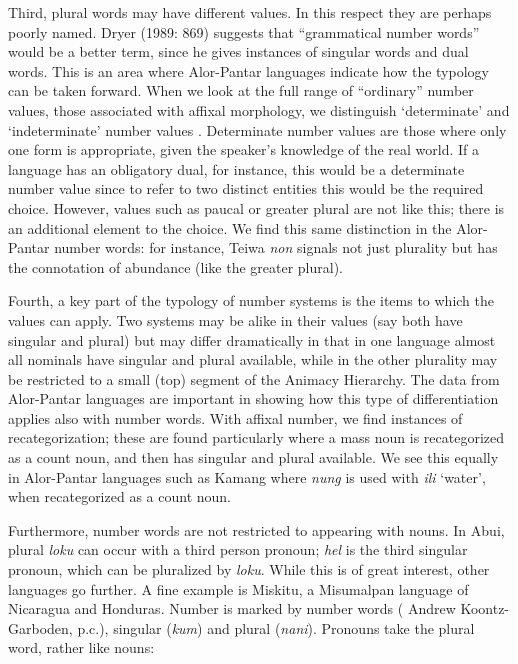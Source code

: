  Third, plural words may have different values. In this respect they are perhaps poorly named. Dryer (1989: 869) suggests that ``grammatical number words'' would be a better term, since he gives instances of singular words and dual words. This is an area where Alor-Pantar languages indicate how the typology can be taken forward. When we look at the full range of ``ordinary'' number values, those associated with affixal morphology, we distinguish `determinate' and `indeterminate' number values \citep[39-41]{Corbett2000}. Determinate number values are those where only one form is appropriate, given the speaker's knowledge of the real world. If a language has an obligatory dual, for instance, this would be a determinate number value since to refer to two distinct entities this would be the required choice. However, values such as paucal or greater plural are not like this; there is an additional element to the choice. We find this same distinction in the Alor-Pantar number words: for instance, Teiwa \textit{non
}signals not just plurality but has the connotation of abundance (like the greater plural).

 Fourth, a key part of the typology of number systems is the items to which the values can apply. Two systems may be alike in their values (say both have singular and plural) but may differ dramatically in that in one language almost all nominals have singular and plural available, while in the other plurality may be restricted to a small (top) segment of the Animacy Hierarchy. The data from Alor-Pantar languages are important in showing how this type of differentiation applies also with number words. With affixal number, we find instances of recategorization; these are found particularly where a mass noun is recategorized as a count noun, and then has singular and plural available. We see this equally in Alor-Pantar languages such as Kamang where \textit{nung} is used with \textit{ili} `water', when recategorized as a count noun.

 Furthermore, number words are not restricted to appearing with nouns. In Abui, plural \textit{loku} can occur with a third person pronoun; \textit{hel} is the third singular pronoun, which can be pluralized by \textit{loku}. While this is of great interest, other languages go further. A fine example is Miskitu, a Misumalpan language of Nicaragua and Honduras. Number is marked by number words (\citealt{Greenms} Andrew Koontz-Garboden, p.c.), singular (\textit{kum}) and plural (\textit{nani}). Pronouns take the plural word, rather like nouns:


